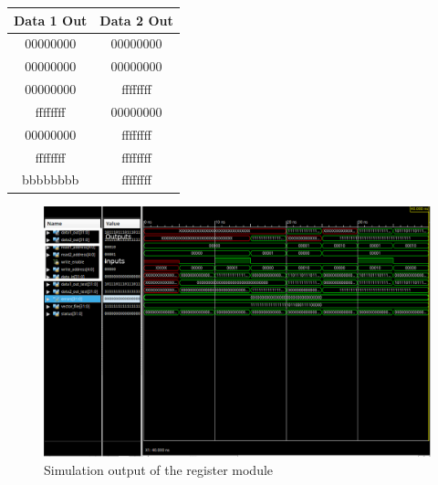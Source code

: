 \documentclass{article}
\begin{document}
    \begin{center}
        \begin{tabular}{|c|c|}
            \hline
            Data 1 Out & Data 2 Out
            \\\hline\hline
            00000000 & 00000000
            \\\hline
            00000000 & 00000000
            \\\hline
            00000000 & ffffffff
            \\\hline
            ffffffff & 00000000
            \\\hline
            00000000 & ffffffff
            \\\hline
            ffffffff & ffffffff
            \\\hline
            bbbbbbbb & ffffffff
            \\\hline
        \end{tabular}
    \end{center}


    \begin{figure}[H]
        \centering
        \includegraphics[width=0.9\paperwidth,center]{Screenshots/register.png}
        \caption{Simulation output of the register module}
    \end{figure}
\end{document}
